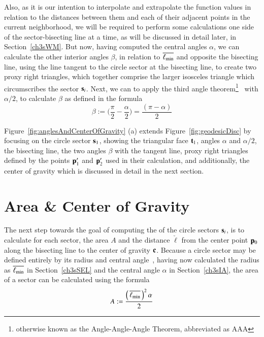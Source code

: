 Also, as it is our intention to interpolate and extrapolate the function values in relation to the distances between them and each of their adjacent points in the current neighborhood, we will be required to perform some calculations one side of the sector-bisecting line at a time, as will be discussed in detail later, in Section~\ref{ch3sWM}. But now, having computed the central angles $\alpha$, we can calculate the other interior angles $\beta$, in relation to $\overline{\ell_\text{min}}$ and opposite the bisecting line, using the line tangent to the circle sector at the bisecting line, to create two proxy right triangles, which together comprise the larger isosceles triangle which circumscribes the sector $\mathbf{s}_i$. Next, we can to apply the third angle theorem\footnote{otherwise known as the Angle-Angle-Angle Theorem, abbreviated as AAA}~\cite{Weisstein19f} with $\alpha/2$, to calculate $\beta$ as defined in the formula
%
\begin{equation}
	\beta := \Big(\frac{\pi}{2} - \frac{\alpha}{2}\Big) = \frac{(\pi - \alpha)}{2}
	\label{eq:betaFromHalfAlpha}
\end{equation}%
%
%

Figure~\ref{fig:anglesAndCenterOfGravity} (a) extends Figure~\ref{fig:geodesicDisc} by focusing on the circle sector $\mathbf{s}_1$, showing the triangular face $\mathbf{t}_1$, angles $\alpha$ and $\alpha/2$, the bisecting line, the two angles $\beta$ with the tangent line, proxy right triangles defined by the points $\mathbf{p}'_1$ and $\mathbf{p}'_2$ used in their calculation, and additionally, the center of gravity which is discussed in detail in the next section.

%
%
%
%
\section{Area \& Center of Gravity}
\label{ch3sACG}
The next step towards the goal of computing the  of the circle sectors $\mathbf{s}_i$, is to calculate for each sector, the area $A$ and the distance $\check{\ell}$ from the center point $\mathbf{p}_0$ along the bisecting line to the center of gravity $\mathbf{c}$. Because a circle sector may be defined entirely by its radius and central angle~\cite{Weisstein19d}, having now calculated the radius as $\overline{\ell_\text{min}}$ in Section~\ref{ch3sSEL} and the central angle $\alpha$ in Section~\ref{ch3sIA}, the area of a sector can be calculated using the formula
%
\begin{equation}
	A := \frac{\left (\,\overline{\ell_\text{min}}\,\right )^2\alpha}{2}
	\label{eq:circularSectorArea}
\end{equation}

